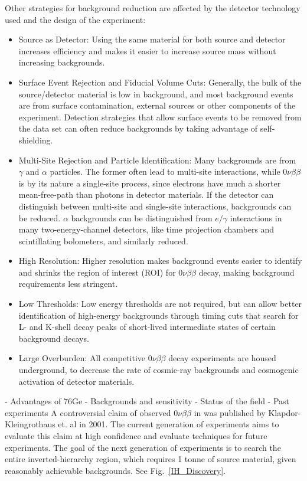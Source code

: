 Other strategies for background reduction are affected by the detector technology used and the design of the experiment:
\begin{itemize}
\item Source as Detector: Using the same material for both source and detector increases efficiency and makes it easier to increase source mass without increasing backgrounds.
\item Surface Event Rejection and Fiducial Volume Cuts: Generally, the bulk of the source/detector material is low in background, and most background events are from surface contamination, external sources or other components of the experiment. Detection strategies that allow surface events to be removed from the data set can often reduce backgrounds by taking advantage of self-shielding.
\item Multi-Site Rejection and Particle Identification: Many backgrounds are from $\gamma$ and $\alpha$ particles. The former often lead to multi-site interactions, while $0\nu\beta\beta$ is by its nature a single-site process, since electrons have much a shorter mean-free-path than photons in detector materials. If the detector can distinguish between multi-site and single-site interactions, backgrounds can be reduced. $\alpha$ backgrounds can be distinguished from $e/\gamma$ interactions in many two-energy-channel detectors, like time projection chambers and scintillating bolometers, and similarly reduced. 
\item High Resolution: Higher resolution makes background events easier to identify and shrinks the region of interest (ROI) for $0\nu\beta\beta$ decay, making background requirements less stringent.
\item Low Thresholds: Low energy thresholds are not required, but can allow better identification of high-energy backgrounds through timing cuts that search for L- and K-shell decay peaks of short-lived intermediate states of certain background decays. 
\item Large Overburden: All competitive $0\nu\beta\beta$ decay experiments are housed underground, to decrease the rate of cosmic-ray backgrounds and cosmogenic activation of detector materials. 
\end{itemize}


	- Advantages of 76Ge
- Backgrounds and sensitivity
- Status of the field
	- Past experiments
A controversial claim of observed $0\nu\beta\beta$ in  was published by Klapdor-Kleingrothaus et. al \cite{KK2001} in 2001. The current generation of experiments aims to evaluate this claim at high confidence and evaluate techniques for future experiments. The goal of the next generation of experiments is to search the entire inverted-hierarchy region, which requires 1 tonne of source material, given reasonably achievable backgrounds. See Fig.~\ref{IH_Discovery}. 

